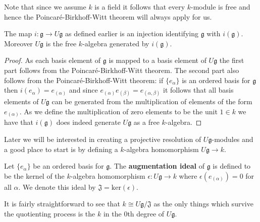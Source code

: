 Note that since we assume $ k $ is a field it follows that every $ k $-module is free and hence the Poincar\'e-Birkhoff-Witt theorem will always apply for us.

\begin{corollary}
  The map $ i: \mathfrak{g} \to U\mathfrak{g} $ as defined earlier is an injection identifying $ \mathfrak{g} $ with $ i(\mathfrak{g}) $. Moreover $ U\mathfrak{g} $ is the free $ k $-algebra generated by $ i(\mathfrak{g}) $.
\end{corollary}
\begin{proof}
  As each basis element of $ \mathfrak{g} $ is mapped to a basis element of $ U\mathfrak{g} $ the first part follows from the Poincar\'e-Birkhoff-Witt theorem. The second part also follows from the Poincar\'e-Birkhoff-Witt theorem: if $ \{e_{\alpha}\} $ is an ordered basis for $ \mathfrak{g} $ then $ i(e_\alpha) = e_{(\alpha)} $ and since $ e_{(\alpha)}e_{(\beta)} = e_{(\alpha, \beta)} $ it follows that all basis elements of $ U\mathfrak{g} $ can be generated from the multiplication of elements of the form $ e_{(\alpha)} $. As we define the multiplication of zero elements to be the unit $ 1 \in k $ we have that $ i(\mathfrak{g}) $ does indeed generate $ U\mathfrak{g} $ as a free $ k $-algebra.
\end{proof}

Later we will be interested in creating a projective resolution of $ U\mathfrak{g} $-modules and a good place to start is by defining a $ k $-algebra homomorphism $ U\mathfrak{g} \to k $.
\begin{definition}
  Let $ \{e_{\alpha}\} $ be an ordered basis for $ \mathfrak{g} $. The \textbf{augmentation ideal} of $ \mathfrak{g} $ is defined to be the kernel of the $ k $-algebra homomorphism $ \epsilon: U\mathfrak{g} \to k $ where $ \epsilon(e_{(\alpha)}) = 0 $ for all $ \alpha $. We denote this ideal by $ \mathfrak{J} = \text{ker}(\epsilon) $.
\end{definition}
It is fairly straightforward to see that $ k \cong U\mathfrak{g}/\mathfrak{J} $ as the only things which survive the quotienting process is the $ k $ in the 0th degree of $ U\mathfrak{g} $.

